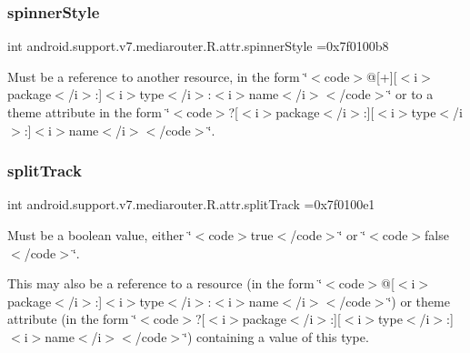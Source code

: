 \subsubsection{\texorpdfstring{spinner\+Style}{spinnerStyle}}
{\footnotesize\ttfamily int android.\+support.\+v7.\+mediarouter.\+R.\+attr.\+spinner\+Style =0x7f0100b8\hspace{0.3cm}{\ttfamily [static]}}

Must be a reference to another resource, in the form \char`\"{}$<$code$>$@\mbox{[}+\mbox{]}\mbox{[}$<$i$>$package$<$/i$>$\+:\mbox{]}$<$i$>$type$<$/i$>$\+:$<$i$>$name$<$/i$>$$<$/code$>$\char`\"{} or to a theme attribute in the form \char`\"{}$<$code$>$?\mbox{[}$<$i$>$package$<$/i$>$\+:\mbox{]}\mbox{[}$<$i$>$type$<$/i$>$\+:\mbox{]}$<$i$>$name$<$/i$>$$<$/code$>$\char`\"{}. \mbox{\label{classandroid_1_1support_1_1v7_1_1mediarouter_1_1R_1_1attr_aa03b4010fc09e6f0eefb355dd934ba9c}} 
\subsubsection{\texorpdfstring{split\+Track}{splitTrack}}
{\footnotesize\ttfamily int android.\+support.\+v7.\+mediarouter.\+R.\+attr.\+split\+Track =0x7f0100e1\hspace{0.3cm}{\ttfamily [static]}}

Must be a boolean value, either \char`\"{}$<$code$>$true$<$/code$>$\char`\"{} or \char`\"{}$<$code$>$false$<$/code$>$\char`\"{}. 

This may also be a reference to a resource (in the form \char`\"{}$<$code$>$@\mbox{[}$<$i$>$package$<$/i$>$\+:\mbox{]}$<$i$>$type$<$/i$>$\+:$<$i$>$name$<$/i$>$$<$/code$>$\char`\"{}) or theme attribute (in the form \char`\"{}$<$code$>$?\mbox{[}$<$i$>$package$<$/i$>$\+:\mbox{]}\mbox{[}$<$i$>$type$<$/i$>$\+:\mbox{]}$<$i$>$name$<$/i$>$$<$/code$>$\char`\"{}) containing a value of this type. \mbox{\label{classandroid_1_1support_1_1v7_1_1mediarouter_1_1R_1_1attr_ab68acd44f9c211553442b740a973421c}} 
